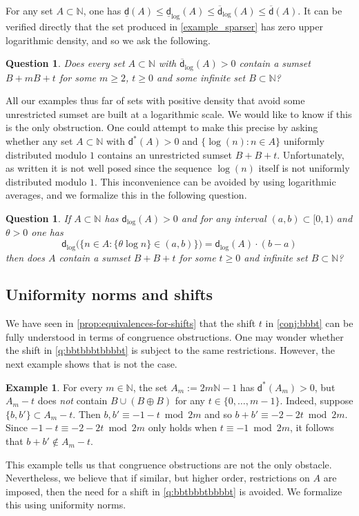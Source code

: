 \documentclass[10pt,dvipsnames]{article}
\newtheorem{question}[theorem]{Question}
\theoremstyle{definition}
\newtheorem{example}[theorem]{Example}
\theoremstyle{plain}
\newcommand{\N}{\mathbb{N}}
\newcommand{\dens}{\mathsf{d}}
\newcommand{\udens}{\overline{\mathsf{d}}}
\newcommand{\ldens}{\underline{\mathsf{d}}}
\newcommand{\ubdens}{\mathsf{d}^*}
\begin{document}
For any set $A\subset\N$, one has $\ldens(A)\leq\ldens_{\log}(A) \leq \udens_{\log}(A) \leq \udens(A)$. 
It can be verified directly that the set produced in \cref{example_sparser} has zero upper logarithmic density, and so we ask the following. 

\begin{question}
\label{question_withmultiplicativehints}
Does every set $A\subset\N$ with $\udens_{\log}(A)>0$ contain a sumset $B+mB+t$ for some $m\geq2$, $t\geq0$ and some infinite set $B\subset\N$?
\end{question}




 
All our examples thus far of sets with positive density that avoid some unrestricted sumset are built at a logarithmic scale. 
We would like to know if this is the only obstruction.
One could attempt to make this precise by asking whether any set $A\subset\N$ with $\ubdens(A)>0$ and $\{\log(n):n\in A\}$ uniformly distributed modulo $1$ contains an unrestricted sumset $B+B+t$.
Unfortunately, as written it is not well posed since the sequence $\log(n)$ itself is not uniformly distributed modulo $1$.
This inconvenience can be avoided by using logarithmic averages, and we formalize this in the following question.

\begin{question}
If $A\subset\N$ has $\dens_{\log}(A)>0$ and for any interval $(a,b)\subset[0,1)$ and $\theta>0$ one has
\[
\dens_{\log}\Big(\Big\{n\in A:\big\{\theta\log n\}\in(a,b)\Big\}\Big)=\dens_{\log}(A)\cdot(b-a)
\]
then does $A$ contain a sumset $B+B+t$ for some $t\geq0$ and  infinite set $B\subset\N$?
\end{question}

\subsection{Uniformity norms and shifts}
\label{sec_uniformity_norms}

We have seen in \cref{prop:equivalences-for-shifts} that the shift $t$ in \cref{conj:bbbt} can be fully understood in terms of congruence obstructions.
One may wonder whether the shift in \cref{q:bbtbbbtbbbbt} is subject to the same restrictions.
However, the next example shows that is not the case.

\begin{example}
\label{example_shift-needed} 
For every $m\in\N$, the set $A_m:=2m\N-1$ has $\ubdens(A_m)>0$, but $A_m-t$ does \emph{not} contain $B\cup(B\oplus B)$ for any $t\in\{0,\dots,m-1\}$.
Indeed, suppose $\{b,b'\}\subset A_m-t$. Then $b,b'\equiv-1-t\bmod2m$ and so $b+b'\equiv-2-2t \bmod2m$. 
Since $-1-t\equiv-2-2t\bmod2m$ only holds when $t\equiv-1\bmod2m$, it follows that $b+b'\notin A_m-t$.
\end{example}
This example tells us that congruence obstructions are not the only obstacle.
Nevertheless, we believe that if similar, but higher order, restrictions on $A$ are imposed, then the need for a shift in \cref{q:bbtbbbtbbbbt} is avoided. 
We formalize this using uniformity norms. 
\end{document}
